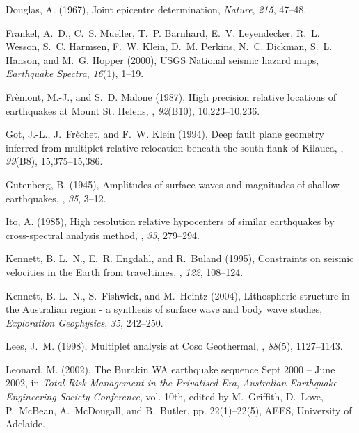 \documentclass[12pt,double]{article}
\begin{document}
\begin{thebibliography}{45}
Douglas, A. (1967), Joint epicentre determination, \textit{Nature},
  \textit{215}, 47--48.

Frankel, A.~D., C.~S. Mueller, T.~P. Barnhard, E.~V. Leyendecker, R.~L. Wesson,
  S.~C. Harmsen, F.~W. Klein, D.~M. Perkins, N.~C. Dickman, S.~L. Hanson, and
  M.~G. Hopper (2000), {USGS} {N}ational seismic hazard maps,
  \textit{Earthquake Spectra}, \textit{16}(1), 1--19.

Fr\`emont, M.-J., and S.~D. Malone (1987), High precision relative locations of
  earthquakes at {M}ount {St.} {H}elens, \jgr, \textit{92}(B10), 10,223--10,236.

Got, J.-L., J.~Fr\`echet, and F.~W. Klein (1994), Deep fault plane geometry
  inferred from multiplet relative relocation beneath the south flank of
  {K}ilauea, \jgr, \textit{99}(B8),
  15,375--15,386.

Gutenberg, B. (1945), Amplitudes of surface waves and magnitudes of shallow
  earthquakes, \bssa,
  \textit{35}, 3--12.

Ito, A. (1985), High resolution relative hypocenters of similar earthquakes by
  cross-spectral analysis method, \jpe,
  \textit{33}, 279--294.

Kennett, B. L.~N., E.~R. Engdahl, and R.~Buland (1995), Constraints on seismic
  velocities in the {E}arth from traveltimes, \gji, \textit{122}, 108--124.

Kennett, B. L.~N., S.~Fishwick, and M.~Heintz (2004), Lithospheric structure in
  the {A}ustralian region - a synthesis of surface wave and body wave studies,
  \textit{Exploration Geophysics}, \textit{35}, 242--250.

Lees, J.~M. (1998), Multiplet analysis at {C}oso {G}eothermal, \bssa, \textit{88}(5), 1127--1143.

Leonard, M. (2002), The {B}urakin {WA} earthquake sequence {S}ept 2000 --
  {J}une 2002, in \textit{Total Risk Management in the Privatised Era},
  \textit{Australian Earthquake Engineering Society Conference}, vol. 10th,
  edited by M.~Griffith, D.~Love, P.~Mc{B}ean, A.~Mc{D}ougall, and B.~Butler,
  pp. 22(1)--22(5), AEES, University of Adelaide.


\end{thebibliography}
\end{document}

